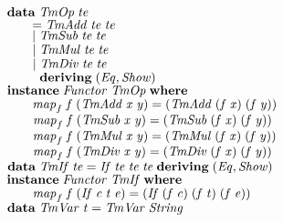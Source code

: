 \documentclass[10pt]{article}
\newcommand{\Conid}[1]{\mathit{#1}}
\newcommand{\Varid}[1]{\mathit{#1}}
\begin{document}
\begin{tabbing}
${}$\\
${\hskip1.00em\relax\mathbf{data}\;\Conid{TmOp}\;\Varid{te}}$\\
${\hskip1.00em\relax\hskip2.00em\relax\mathrel{=}\Conid{TmAdd}\;\Varid{te}\;\Varid{te}}$\\
${\hskip1.00em\relax\hskip2.00em\relax\mid \Conid{TmSub}\;\Varid{te}\;\Varid{te}}$\\
${\hskip1.00em\relax\hskip2.00em\relax\mid \Conid{TmMul}\;\Varid{te}\;\Varid{te}}$\\
${\hskip1.00em\relax\hskip2.00em\relax\mid \Conid{TmDiv}\;\Varid{te}\;\Varid{te}}$\\
${\hskip1.00em\relax\hskip2.00em\relax\phantom{\mid \mbox{}}\mathbf{deriving}\;(\Conid{Eq},\Conid{Show})}$\\
${}$\\
${\hskip1.00em\relax\mathbf{instance}\;\Conid{Functor}\;\Conid{TmOp}\;\mathbf{where}}$\\
${\hskip1.00em\relax\hskip2.00em\relax\Varid{map}_{f}\;\Varid{f}\;(\Conid{TmAdd}\;\Varid{x}\;\Varid{y})\mathrel{=}(\Conid{TmAdd}\;(\Varid{f}\;\Varid{x})\;(\Varid{f}\;\Varid{y}))}$\\
${\hskip1.00em\relax\hskip2.00em\relax\Varid{map}_{f}\;\Varid{f}\;(\Conid{TmSub}\;\Varid{x}\;\Varid{y})\mathrel{=}(\Conid{TmSub}\;(\Varid{f}\;\Varid{x})\;(\Varid{f}\;\Varid{y}))}$\\
${\hskip1.00em\relax\hskip2.00em\relax\Varid{map}_{f}\;\Varid{f}\;(\Conid{TmMul}\;\Varid{x}\;\Varid{y})\mathrel{=}(\Conid{TmMul}\;(\Varid{f}\;\Varid{x})\;(\Varid{f}\;\Varid{y}))}$\\
${\hskip1.00em\relax\hskip2.00em\relax\Varid{map}_{f}\;\Varid{f}\;(\Conid{TmDiv}\;\Varid{x}\;\Varid{y})\mathrel{=}(\Conid{TmDiv}\;(\Varid{f}\;\Varid{x})\;(\Varid{f}\;\Varid{y}))}$\\
${}$\\
${\hskip1.00em\relax\mathbf{data}\;\Conid{TmIf}\;\Varid{te}\mathrel{=}\Conid{If}\;\Varid{te}\;\Varid{te}\;\Varid{te}\;\mathbf{deriving}\;(\Conid{Eq},\Conid{Show})}$\\
${}$\\
${\hskip1.00em\relax\mathbf{instance}\;\Conid{Functor}\;\Conid{TmIf}\;\mathbf{where}}$\\
${\hskip1.00em\relax\hskip2.00em\relax\Varid{map}_{f}\;\Varid{f}\;(\Conid{If}\;\Varid{c}\;\Varid{t}\;\Varid{e})\mathrel{=}(\Conid{If}\;(\Varid{f}\;\Varid{c})\;(\Varid{f}\;\Varid{t})\;(\Varid{f}\;\Varid{e}))}$\\
${}$\\
${\hskip1.00em\relax\mathbf{data}\;\Conid{TmVar}\;\Varid{t}\mathrel{=}\Conid{TmVar}\;\Conid{String}}$\\

\end{tabbing}
\end{document}
